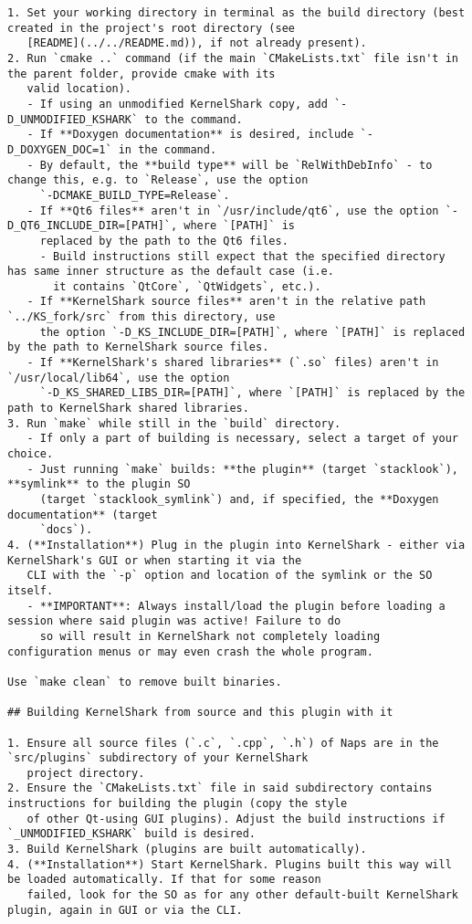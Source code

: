 \begin{verbatim}
1. Set your working directory in terminal as the build directory (best created in the project's root directory (see
   [README](../../README.md)), if not already present).
2. Run `cmake ..` command (if the main `CMakeLists.txt` file isn't in the parent folder, provide cmake with its
   valid location).
   - If using an unmodified KernelShark copy, add `-D_UNMODIFIED_KSHARK` to the command.
   - If **Doxygen documentation** is desired, include `-D_DOXYGEN_DOC=1` in the command.
   - By default, the **build type** will be `RelWithDebInfo` - to change this, e.g. to `Release`, use the option 
     `-DCMAKE_BUILD_TYPE=Release`.
   - If **Qt6 files** aren't in `/usr/include/qt6`, use the option `-D_QT6_INCLUDE_DIR=[PATH]`, where `[PATH]` is 
     replaced by the path to the Qt6 files.
     - Build instructions still expect that the specified directory has same inner structure as the default case (i.e. 
       it contains `QtCore`, `QtWidgets`, etc.).
   - If **KernelShark source files** aren't in the relative path `../KS_fork/src` from this directory, use
     the option `-D_KS_INCLUDE_DIR=[PATH]`, where `[PATH]` is replaced by the path to KernelShark source files.
   - If **KernelShark's shared libraries** (`.so` files) aren't in `/usr/local/lib64`, use the option
     `-D_KS_SHARED_LIBS_DIR=[PATH]`, where `[PATH]` is replaced by the path to KernelShark shared libraries.
3. Run `make` while still in the `build` directory.
   - If only a part of building is necessary, select a target of your choice.
   - Just running `make` builds: **the plugin** (target `stacklook`), **symlink** to the plugin SO 
     (target `stacklook_symlink`) and, if specified, the **Doxygen documentation** (target 
     `docs`).
4. (**Installation**) Plug in the plugin into KernelShark - either via KernelShark's GUI or when starting it via the 
   CLI with the `-p` option and location of the symlink or the SO itself.
   - **IMPORTANT**: Always install/load the plugin before loading a session where said plugin was active! Failure to do
     so will result in KernelShark not completely loading configuration menus or may even crash the whole program.

Use `make clean` to remove built binaries.

## Building KernelShark from source and this plugin with it 

1. Ensure all source files (`.c`, `.cpp`, `.h`) of Naps are in the `src/plugins` subdirectory of your KernelShark 
   project directory.
2. Ensure the `CMakeLists.txt` file in said subdirectory contains instructions for building the plugin (copy the style 
   of other Qt-using GUI plugins). Adjust the build instructions if `_UNMODIFIED_KSHARK` build is desired.
3. Build KernelShark (plugins are built automatically).
4. (**Installation**) Start KernelShark. Plugins built this way will be loaded automatically. If that for some reason 
   failed, look for the SO as for any other default-built KernelShark plugin, again in GUI or via the CLI.


\end{verbatim}
